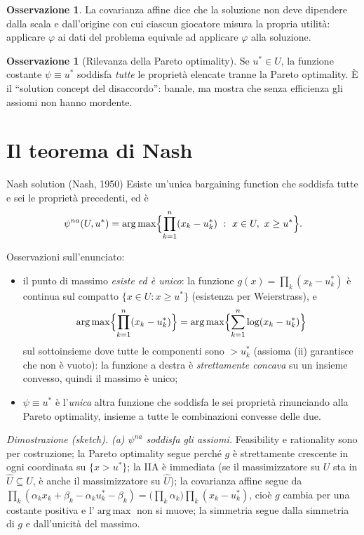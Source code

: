 \documentclass[12pt,a4paper,twoside]{book}
\theoremstyle{plain}
\theoremstyle{definition}
\newtheorem{remark}[theorem]{Osservazione}
\newcommand{\argmax}{\operatorname*{arg\,max}}
\begin{document}
\begin{remark}
La covarianza affine dice che la soluzione non deve dipendere dalla scala e dall'origine con
cui ciascun giocatore misura la propria utilità: applicare $\varphi$ ai dati del problema
equivale ad applicare $\varphi$ alla soluzione.
\end{remark}

\begin{remark}[Rilevanza della Pareto optimality]
Se $u^*\in U$, la funzione costante $\psi\equiv u^*$ soddisfa \emph{tutte} le proprietà
elencate tranne la Pareto optimality. È il ``solution concept del disaccordo'': banale,
ma mostra che senza efficienza gli assiomi non hanno mordente.
\end{remark}

\section{Il teorema di Nash}

\begin{thmbox}{Nash solution (Nash, 1950)}
Esiste un'unica bargaining function che soddisfa tutte e sei le proprietà precedenti, ed è
\[
  \psi^{na}(U,u^*)=\argmax\Bigl\{\prod_{k=1}^n (x_k-u^*_k)\ :\ x\in U,\ x\ge u^*\Bigr\}.
\]
\end{thmbox}

\noindent Osservazioni sull'enunciato:
\begin{itemize}
  \item il punto di massimo \emph{esiste ed è unico}: la funzione $g(x)=\prod_k(x_k-u^*_k)$
        è continua sul compatto $\{x\in U : x\ge u^*\}$ (esistenza per Weierstrass), e
        \[
          \argmax\Bigl\{\prod_{k=1}^n(x_k-u^*_k)\Bigr\}
          =\argmax\Bigl\{\sum_{k=1}^n\log(x_k-u^*_k)\Bigr\}
        \]
        sul sottoinsieme dove tutte le componenti sono $>u^*_k$ (assioma (ii) garantisce che
        non è vuoto): la funzione a destra è \emph{strettamente concava} su un insieme
        convesso, quindi il massimo è unico;
  \item $\psi\equiv u^*$ è l'\emph{unica} altra funzione che soddisfa le sei proprietà
        rinunciando alla Pareto optimality, insieme a tutte le combinazioni convesse delle due.
\end{itemize}

\textit{Dimostrazione (sketch).}
\emph{(a) $\psi^{na}$ soddisfa gli assiomi.} Feasibility e rationality sono per costruzione;
la Pareto optimality segue perché $g$ è strettamente crescente in ogni coordinata su
$\{x>u^*\}$; la IIA è immediata (se il massimizzatore su $U$ sta in $\widehat U\subseteq U$,
è anche il massimizzatore su $\widehat U$); la covarianza affine segue da
$\prod_k(\alpha_kx_k+\beta_k-\alpha_ku^*_k-\beta_k)=\bigl(\prod_k\alpha_k\bigr)\prod_k(x_k-u^*_k)$,
cioè $g$ cambia per una costante positiva e l'$\argmax$ non si muove; la simmetria segue
dalla simmetria di $g$ e dall'unicità del massimo.
\end{document}
